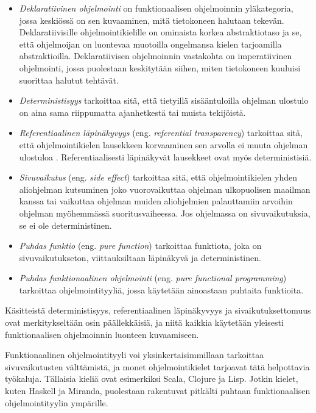 \begin{itemize}
	\item \textit{Deklaratiivinen ohjelmointi} on funktionaalisen ohjelmoinnin yläkategoria, jossa keskiössä on sen kuvaaminen, mitä tietokoneen halutaan tekevän. Deklaratiivisille ohjelmointikielille on ominaista korkea abstraktiotaso ja se, että ohjelmoijan on luontevaa muotoilla ongelmansa kielen tarjoamilla abstraktioilla. Deklaratiivisen ohjelmoinnin vastakohta on imperatiivinen ohjelmointi, jossa puolestaan keskitytään siihen, miten tietokoneen kuuluisi suorittaa halutut tehtävät.

	\item \textit{Deterministisyys} tarkoittaa sitä, että tietyillä sisääntuloilla ohjelman ulostulo on aina sama riippumatta ajanhetkestä tai muista tekijöistä.

	\item \textit{Referentiaalinen läpinäkyvyys} (eng. \textit{referential transparency}) tarkoittaa sitä, että ohjelmointikielen lausekkeen korvaaminen sen arvolla ei muuta ohjelman ulostuloa \citep{hudak1989conception}. Referentiaalisesti läpinäkyvät lausekkeet ovat myös deterministisiä.

	\item \textit{Sivuvaikutus} (eng. \textit{side effect}) tarkoittaa sitä, että ohjelmointikielen yhden aliohjelman kutsuminen joko vuorovaikuttaa ohjelman ulkopuolisen maailman kanssa tai vaikuttaa ohjelman muiden aliohjelmien palauttamiin arvoihin ohjelman myöhemmässä suoritusvaiheessa. Jos ohjelmassa on sivuvaikutuksia, se ei ole deterministinen.

	\item \textit{Puhdas funktio} (eng. \textit{pure function}) tarkoittaa funktiota, joka on sivuvaikutukseton, viittauksiltaan läpinäkyvä ja deterministinen.

	\item \textit{Puhdas funktionaalinen ohjelmointi} (eng. \textit{pure functional programming}) tarkoittaa ohjelmointityyliä, jossa käytetään ainoastaan puhtaita funktioita.
\end{itemize}

Käsitteistä deterministisyys, referentiaalinen läpinäkyvyys ja sivaikutuksettomuus ovat merkitykseltään osin päällekkäisiä, ja niitä kaikkia käytetään yleisesti funktionaalisen ohjelmoinnin luonteen kuvaamiseen.

Funktionaalinen ohjelmointityyli voi yksinkertaisimmillaan tarkoittaa sivuvaikutusten välttämistä, ja monet ohjelmointikielet tarjoavat tätä helpottavia työkaluja. Tällaisia kieliä ovat esimerkiksi Scala, Clojure ja Lisp. Jotkin kielet, kuten Haskell ja Miranda, puolestaan rakentuvat pitkälti puhtaan funktionaalisen ohjelmointityylin ympärille.

